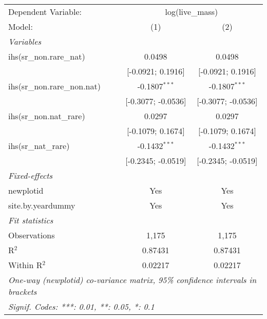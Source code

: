 \begin{tabular}{lcc}
\tabularnewline\midrule\midrule
Dependent Variable:&\multicolumn{2}{c}{log(live\_mass)}\\
Model:&(1) & (2)\\
\midrule \emph{Variables}&   &  \\
ihs(sr\_non.rare\_nat)&0.0498 & 0.0498\\
  &[-0.0921; 0.1916] & [-0.0921; 0.1916]\\
ihs(sr\_non.rare\_non.nat)&-0.1807$^{***}$ & -0.1807$^{***}$\\
  &[-0.3077; -0.0536] & [-0.3077; -0.0536]\\
ihs(sr\_non.nat\_rare)&0.0297 & 0.0297\\
  &[-0.1079; 0.1674] & [-0.1079; 0.1674]\\
ihs(sr\_nat\_rare)&-0.1432$^{***}$ & -0.1432$^{***}$\\
  &[-0.2345; -0.0519] & [-0.2345; -0.0519]\\
\midrule \emph{Fixed-effects}&   &  \\
newplotid & Yes & Yes\\
site.by.yeardummy & Yes & Yes\\
\midrule \emph{Fit statistics}&  & \\
Observations & 1,175&1,175\\
R$^2$ & 0.87431&0.87431\\
Within R$^2$ & 0.02217&0.02217\\
\midrule\midrule\multicolumn{3}{l}{\emph{One-way (newplotid) co-variance matrix, 95\% confidence intervals in brackets}}\\
\multicolumn{3}{l}{\emph{Signif. Codes: ***: 0.01, **: 0.05, *: 0.1}}\\
\end{tabular}


